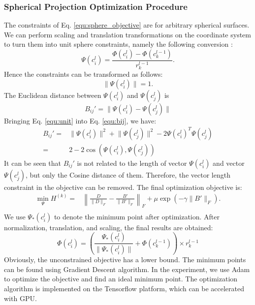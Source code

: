 \documentclass{article}
\theoremstyle{definition}
\begin{document}
    \subsubsection{Spherical Projection Optimization Procedure}
    The constraints of Eq. \ref{equ:sphere_objective} are for arbitrary spherical surfaces. We can perform scaling and translation transformations on the coordinate system to turn them into unit sphere constraints, namely the following conversion :
    \begin{equation}
    	\label{equ:transfer}
    	\Psi(c_i^l) = \frac{\Phi(c_i^l) - \Phi(c_k^{l-1})}{r_k^{l-1}}.
    \end{equation}
    Hence the constraints can be transformed as follows:
    \begin{equation}
    \label{equ:unit}
    	\lVert \Psi(c_i^l) \rVert = 1.
    \end{equation}
    The Euclidean distance between $\Psi(c_i^{l})$ and $\Psi(c_j^l)$ is 
    \begin{equation}
    \label{equ:bij}
    	B_{ij}' = \lVert \Psi(c_i^{l}) - \Psi(c_j^l) \rVert
    \end{equation}
    Bringing Eq. \ref{equ:unit} into Eq. \ref{equ:bij}, we have:
    \begin{equation}
    \begin{split}
    	B_{ij}' = & \lVert \Psi(c_i^l) \rVert^2 + \lVert \Psi(c_j^l) \rVert^2 - 2 \Psi(c_i^l)^T \Psi(c_j^l) \\
    	= & 2 - 2\cos(\Psi(c_i^l), \Psi(c_j^l))
    \end{split}
    \end{equation}
    It can be seen that $B_{ij}'$ is not related to the length of vector $\Psi(c_i^l)$ and vector $\Psi(c_j^l)$, but only the Cosine distance of them. Therefore, the vector length constraint in the objective can be removed. The final optimization objective is: 
    \begin{equation}
	 	\label{equ:sphere_objective}
        \begin{split}
            \min_{\Psi} H^{(k)} =  & \left\lVert\frac{D}{\lVert D \rVert_F} - \frac{B'}{\lVert B' \rVert_F}\right\rVert_F + \mu \exp(- \gamma \lVert B' \rVert_F).\\ 
        \end{split}
    \end{equation}
    We use $\Psi_*(c_i^l)$ to denote the minimum point after optimization. After normalization, translation, and scaling, the final results are obtained: 
    \begin{equation}
    	\Phi(c_i^l) = \left(\frac{\Psi_*(c_i^l)}{\lVert \Psi_*(c_i^l) \rVert}  + \Phi(c_k^{l-1})\right) \times r_k^{l-1}
    \end{equation}
    Obviously, the unconstrained objective has a lower bound. The minimum points can be found using Gradient Descent algorithm. In the experiment, we use Adam \cite{Rushing2005ADaM} to optimize the objective and find an ideal minimum point. The optimization algorithm is implemented on the Tensorflow platform, which can be accelerated with GPU.
\end{document}
